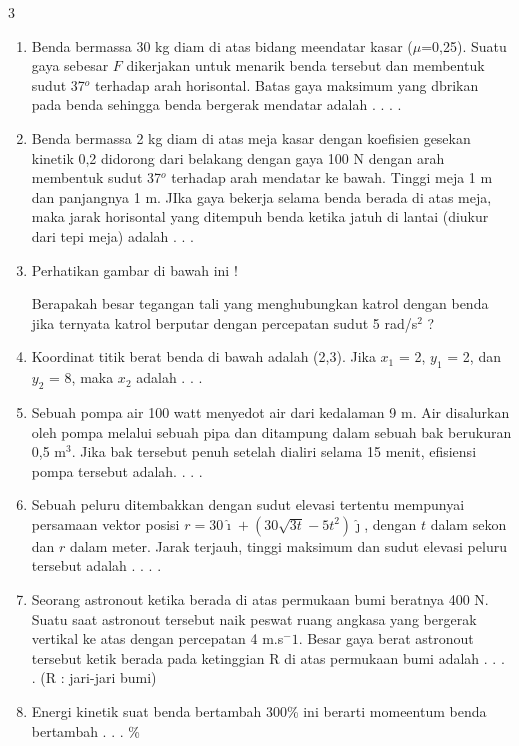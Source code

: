 \documentclass[10pt,a4paper]{article}
\begin{document}
\begin{multicols*} {3}
\begin{enumerate}[itemsep=0mm]
\item Benda bermassa 30 kg diam di atas bidang meendatar kasar ($\mu$=0,25). Suatu gaya sebesar $F$ dikerjakan untuk menarik benda tersebut dan membentuk sudut 37$^o$ terhadap arah horisontal. Batas gaya maksimum yang dbrikan pada benda sehingga benda bergerak mendatar adalah . . . .

\item Benda bermassa 2 kg diam di atas meja kasar dengan koefisien gesekan kinetik 0,2 didorong dari belakang dengan gaya 100 N dengan arah membentuk sudut 37$^o$ terhadap arah mendatar ke bawah. Tinggi meja 1 m dan panjangnya 1 m. JIka gaya bekerja selama benda berada di atas meja, maka jarak horisontal yang ditempuh benda ketika jatuh di lantai (diukur dari tepi meja) adalah . . .

\item Perhatikan gambar di bawah ini !

Berapakah besar tegangan tali yang menghubungkan katrol dengan benda jika ternyata katrol berputar dengan percepatan sudut 5 rad/s$^2$ ?

\item Koordinat titik berat benda di bawah adalah (2,3). Jika $x_1$ = 2, $y_1$ = 2, dan $y_2$ = 8, maka $x_2$ adalah . . .


\item Sebuah pompa air 100 watt menyedot air dari kedalaman 9 m. Air disalurkan oleh pompa melalui sebuah pipa dan ditampung dalam sebuah bak berukuran 0,5 m$^3$. Jika bak tersebut penuh setelah dialiri selama 15 menit, efisiensi pompa tersebut adalah. . . .

\item Sebuah peluru ditembakkan dengan sudut elevasi tertentu mempunyai persamaan vektor posisi $r= 30 \hat{\imath} + \left ( 30\sqrt{3t} - 5t^2 \right )\hat{\jmath}$, dengan $t$ dalam sekon dan $r$ dalam meter. Jarak terjauh, tinggi maksimum dan sudut elevasi peluru tersebut adalah . . . .

\item Seorang astronout ketika berada di atas permukaan bumi beratnya 400 N. Suatu saat astronout tersebut naik peswat ruang angkasa yang bergerak vertikal ke atas dengan percepatan 4 m.s$^-1$. Besar gaya berat astronout tersebut ketik berada pada ketinggian R di atas permukaan bumi adalah . . . . (R : jari-jari bumi)


\item Energi kinetik suat benda bertambah 300\% ini berarti momeentum benda bertambah . . . \%


\end{enumerate}
\end{multicols*}
 \vspace{1cm}




 
\end{document}

